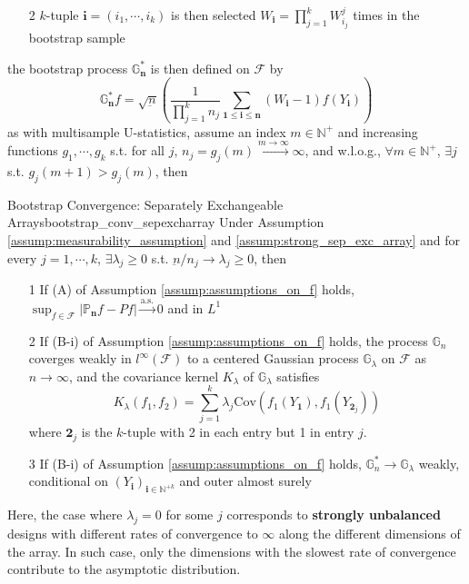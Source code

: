 \documentclass[twoside]{article}
\begin{document}
\begin{itemize}
\begin{itemize}
        \item[2] $k$-tuple $\mathbf{i}=\left(i_1,\cdots,i_k\right)$ is then selected $W_{\mathbf{i}}= \prod^k_{j=1} W_{i_j}^j$ times in the bootstrap sample 
    \end{itemize}
    the bootstrap process $\mathbb{G}^*_{\mathbf{n}}$ is then defined on $\mathcal{F}$ by 
    \begin{equation*}
        \mathbb{G}^*_{\mathbf{n}} f = \sqrt{\underbar{n}} \left(\frac{1}{\prod^k_{j=1}n_j} \sum_{\mathbf{1\leq i\leq n}}\left(W_{\mathbf{i}}-1\right) f(Y_{\mathbf{i}}) \right)
    \end{equation*}
    as with multisample U-statistics, assume an index $m\in \mathbb{N}^+$ and increasing functions $g_1,\cdots,g_k$ s.t. for all $j$, $n_j=g_j\left(m\right)\xrightarrow{m\rightarrow\infty} \infty$, and w.l.o.g., $\forall m\in\mathbb{N}^+$, $\exists j$ s.t. $g_j(m+1)>g_j(m)$, then  
    \begin{theorem}{Bootstrap Convergence: Separately Exchangeable Arrays}{bootstrap_conv_sepexcharray}
        Under Assumption \ref{assump:measurability_assumption} and \ref{assump:strong_sep_exc_array} and for every $j=1,\cdots,k$, $\exists\lambda_j\geq0$ s.t. $\underbar{n}/n_j \rightarrow \lambda_j \geq 0$, then 
        \begin{itemize}
            \item[1] If (A) of Assumption \ref{assump:assumptions_on_f} holds, $\sup_{f\in\mathcal{F}} \left\vert \mathbb{P}_{\mathbf{n}}f - Pf \right\vert \xrightarrow{\mathrm{a.s.}} 0$ and in $L^1$
            \item[2] If (B-i) of Assumption \ref{assump:assumptions_on_f} holds, the process $\mathbb{G}_n$ coverges weakly in $l^{\infty}(\mathcal{F})$ to a centered Gaussian process $\mathbb{G}_{\lambda}$ on $\mathcal{F}$ as $n\rightarrow\infty$, and the covariance kernel $K_{\lambda}$ of $\mathbb{G}_{\lambda}$ satisfies 
            \begin{equation*}
                K_{\lambda}\left(f_1,f_2\right) = \sum^k_{j=1}\lambda_j \mathrm{Cov}\left(f_1\left(Y_{\mathbf{1}}\right),f_1\left(Y_{\mathbf{2}_j}\right)\right)
            \end{equation*}
            where $\mathbf{2}_j$ is the $k$-tuple with 2 in each entry but 1 in entry $j$.
            \item[3] If (B-i) of Assumption \ref{assump:assumptions_on_f} holds, $\mathbb{G}^*_n \rightarrow \mathbb{G}_{\lambda}$ weakly, conditional on $\left(Y_{\mathbf{i}}\right)_{\mathbf{i}\in \mathbb{N}^{+k}}$ and outer almost surely
        \end{itemize}
    \end{theorem}
    Here, the case where $\lambda_j=0$ for some $j$ corresponds to \textbf{strongly unbalanced} designs with different rates of convergence to $\infty$ along the different dimensions of the array. In such case, only the dimensions with the slowest rate of convergence contribute to the asymptotic distribution.
\end{itemize}
\end{document}
